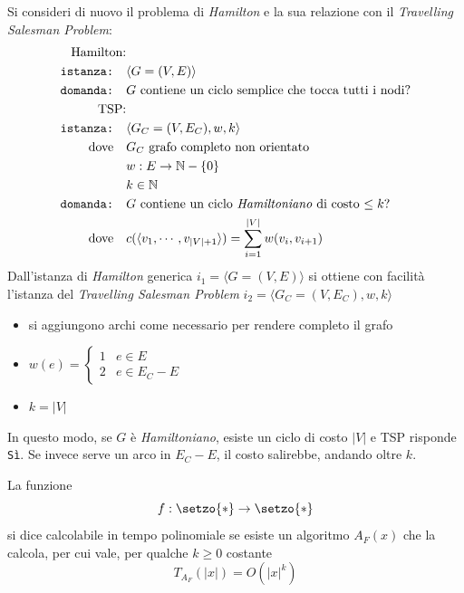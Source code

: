 Si consideri di nuovo il problema di \emph{Hamilton} e la sua relazione con il \emph{Travelling Salesman Problem}:
\begin{align*}
    \text{Hamilton:} & \quad \\
    \texttt{istanza:} \quad & \langle G=(V,E) \rangle \\
    \texttt{domanda:} \quad & G \text{ contiene un ciclo semplice che tocca tutti i nodi?} \\
    \text{TSP:} & \quad \\
    \texttt{istanza:} \quad & \langle G_C=(V,E_C), w, k \rangle \\
    \text{dove} \quad & G_C \text{ grafo completo non orientato} \\
    & w : E \to \mathbb{N} - \left\{ 0 \right\} \\
    & k \in \mathbb{N} \\
    \texttt{domanda:} \quad & G \text{ contiene un ciclo \emph{Hamiltoniano} di costo $\leq k$?} \\
    \text{dove} \quad &  c(\langle v_1, \cdots, v_{|V|+1} \rangle) = \sum_{i=1}^{|V|} w(v_i, v_{i+1} )  \\
\end{align*}
Dall'istanza di \emph{Hamilton} generica 
$i_1 = \langle G=(V,E) \rangle$
si ottiene con facilità l'istanza del \emph{Travelling Salesman Problem}
$i_2 = \langle G_C=(V,E_C), w, k \rangle$
\begin{itemize}[parsep=0pt,partopsep=0pt,topsep=2pt]
    \item si aggiungono archi come necessario per rendere completo il grafo
    \item $w(e) = 
        \begin{cases}
            1 & e \in E \\
            2 & e \in E_C - E
        \end{cases}
        $
    \item $k = |V|$
\end{itemize}
In questo modo, se $G$ è \emph{Hamiltoniano}, esiste un ciclo di costo $|V|$ e TSP risponde \texttt{Sì}. Se invece serve un arco in $E_C - E$, il costo salirebbe, andando oltre $k$.

\begin{definition}
    \label{def:funzionectp}
    La funzione
    \begin{equation*}
        f : \setzo{*} \to \setzo{*} 
    \end{equation*}
    si dice calcolabile in tempo polinomiale se esiste un algoritmo $A_F (x)$ che la calcola, per cui vale, per qualche $k \geq 0$ costante
    \begin{equation*}
        T_{A_{F}} (|x|) = O \left( |x|^{k} \right)
    \end{equation*}
\end{definition}


